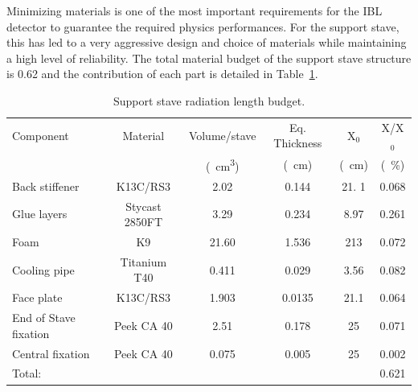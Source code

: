 Minimizing materials is one of the most important requirements for the IBL detector to guarantee the required physics performances. For the support stave, this has led to a very aggressive design and choice of materials while maintaining a high level of reliability. The total material budget of the support stave structure is \SI{0.62}{\xzero} and the contribution of each part is  detailed in Table~\ref{tab:staveX0}. %


\begin{table}
\centering
\begin{tabular}{l c c c c c }
\hline \hline
        Component & Material  & Volume/stave      & Eq. Thickness & X$_0$ & X/X$_0$  \\
                      &   &  (\SI{}{\centi\meter^3}) &             (\SI{}{\centi\meter})      & (\SI{}{\centi\meter})             & (\SI{}{\percent})      \\
\hline

Back stiffener    &  K13C/RS3 & 2.02 & 0.144 & 21. 1 & 0.068 \\
Glue layers & Stycast 2850FT & 3.29 & 0.234 & 8.97  &  0.261\\
Foam                             & K9 & 21.60 & 1.536 & 213 &   0.072\\
Cooling pipe & Titanium T40           & 0.411 & 0.029 & 3.56 &  0.082\\
Face plate       &  K13C/RS3 & 1.903 & 0.0135 & 21.1 & 0.064 \\
End of Stave fixation & Peek CA 40 & 2.51   & 0.178 & 25 &  0.071\\
Central fixation          & Peek CA 40 & 0.075 & 0.005 & 25 & 0.002 \\
\hline
Total:              &  &  &  &  & 0.621 \\
\hline \hline
\end{tabular}   
\caption{Support stave radiation length budget.  %
\label{tab:staveX0}}
\end{table}


